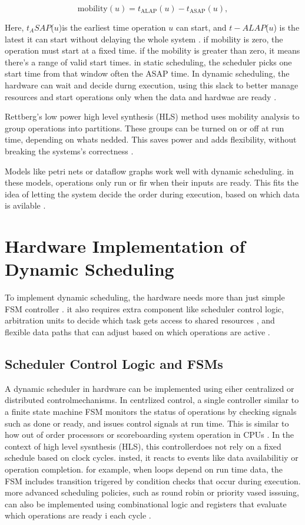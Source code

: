 \documentclass[conference]{IEEEtran}
\begin{document}
\begin{equation}
\text{mobility}(u) = t_{\text{ALAP}}(u) - t_{\text{ASAP}}(u),
\label{eq:mobility}
\end{equation}

Here, $t_ASAP$($u$)is the earliest time operation $u$ can start, and $t-ALAP$($u$) is the latest it can start without delaying the whole system \cite{DeMicheli1994}. if mobility is zero, the operation must start at a fixed time. if the mobility is greater than zero, it means there's a range of valid start times. in static scheduling, the scheduler picks  one start time from that window often the ASAP time. In dynamic scheduling, the hardware can wait and decide durng execution, using this slack to better manage resources and start operations only when the data and hardwae are ready \cite{Rettberg2006}.

Rettberg's low power high level synthesis (HLS) method uses mobility analysis to group operations into partitions. These groups can be turned on or off at run time, depending on whats nedded. This saves power and adds flexibility, without breaking the systems's correctness \cite{Rettberg2006}. 

Models like petri nets or dataflow graphs work well with dynamic scheduling. in these models, operations only run or fir when their inputs are ready. This fits the idea of letting the system decide the order during execution, based on which data is avilable \cite{Rettberg2006}. 

\section{Hardware Implementation of Dynamic Scheduling}
To implement dynamic scheduling, the hardware needs more than just simple FSM controller . it also requires extra component like scheduler control logic, arbitration units  to decide which task gets access to shared resources , and flexible data paths that can adjust based on which operations are active \cite{DeMicheli1994, Rettberg2006}. 

\subsection{Scheduler Control Logic and FSMs}
A dynamic scheduler in hardware can be implemented using eiher centralized or distributed controlmechanisms.
In centrlized control, a single controller similar to a finite state machine FSM monitors the status of operations by checking signals such as done or ready, and issues control signals at run time. This is similar to how out of order processors or scoreboarding system operation in CPUs \cite{DeMicheli1994}. In the context of high level sysnthesis (HLS), this controllerdoes not rely on a fixed schedule based on clock cycles. insted, it reacts to events like data availabilitiy or operation completion. for example, when loops depend on run time data, the FSM includes transition trigered by condition checks that occur during execution. more advanced scheduling policies, such as round robin or priority vased isssuing, can also be implemented using combinational logic  and registers that evaluate which operations are ready i each cycle \cite{DeMicheli1994, Rettberg2006}.
\end{document}
